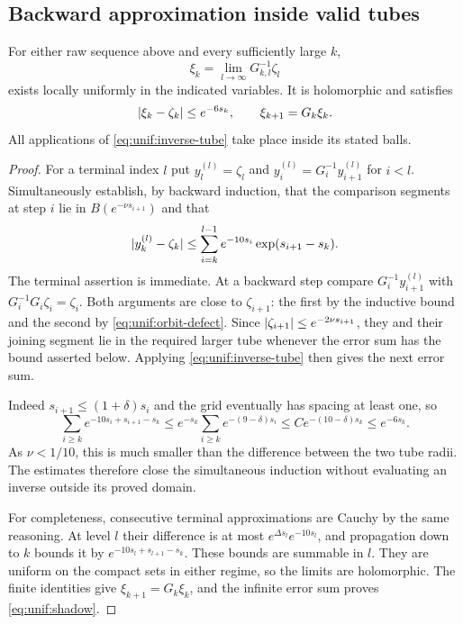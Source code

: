 \subsection{Backward approximation inside valid tubes}

\begin{lemma}
\label{lem:unif:backward-limit}
For either raw sequence above and every sufficiently large $k$,
\[
 \xi_k=\lim_{l\to\infty}G_{k,l}^{-1}\zeta_l
\]
exists locally uniformly in the indicated variables.  It is
holomorphic and satisfies
\begin{equation}
 \lvert\xi_k-\zeta_k\rvert\le e^{-6s_k},\qquad
 \xi_{k+1}=G_k\xi_k.
 \label{eq:unif:shadow}
\end{equation}
All applications of \eqref{eq:unif:inverse-tube} take place inside
its stated balls.
\end{lemma}

\begin{proof}
For a terminal index $l$ put $y_l^{(l)}=\zeta_l$ and
$y_i^{(l)}=G_i^{-1}y_{i+1}^{(l)}$ for $i<l$.
Simultaneously establish, by backward induction, that the comparison
segments at step $i$ lie in $B(e^{-\nu s_{i+1}})$ and that
\begin{equation}
 \lvert y_k^{(l)}-\zeta_k\rvert
 \le \sum_{i=k}^{l-1}
       e^{-10s_i}\exp(s_{i+1}-s_k).
 \label{eq:unif:finite-error-sum}
\end{equation}
The terminal assertion is immediate.  At a backward step compare
$G_i^{-1}y_{i+1}^{(l)}$ with
$G_i^{-1}G_i\zeta_i=\zeta_i$.
Both arguments are close to $\zeta_{i+1}$: the first by the inductive
bound and the second by \eqref{eq:unif:orbit-defect}.  Since
$\lvert\zeta_{i+1}\rvert\le e^{-2\nu s_{i+1}}$, they and their joining
segment lie in the required larger tube whenever the error sum has
the bound asserted below.  Applying
\eqref{eq:unif:inverse-tube} then gives the next error sum.

Indeed $s_{i+1}\le(1+\delta)s_i$ and the grid eventually has spacing
at least one, so
\[
 \sum_{i\ge k}e^{-10s_i+s_{i+1}-s_k}
 \le e^{-s_k}\sum_{i\ge k}e^{-(9-\delta)s_i}
 \le C e^{-(10-\delta)s_k}\le e^{-6s_k}.
\]
As $\nu<1/10$, this is much smaller than the difference between the
two tube radii.  The estimates therefore close the simultaneous
induction without evaluating an inverse outside its proved domain.

For completeness, consecutive terminal approximations are Cauchy
by the same reasoning.  At level $l$ their difference is at most
$e^{\Delta s_l}e^{-10s_l}$, and propagation down to $k$ bounds it by
$e^{-10s_l+s_{l+1}-s_k}$.  These bounds are summable in $l$.
They are uniform on the compact sets in either regime, so the limits
are holomorphic.  The finite identities give
$\xi_{k+1}=G_k\xi_k$, and the infinite error sum proves
\eqref{eq:unif:shadow}.
\end{proof}

